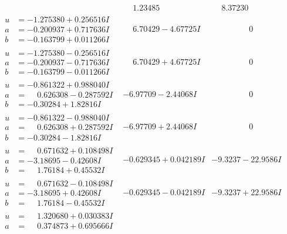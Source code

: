 \documentclass[1p]{elsarticle_modified}
\theoremstyle{definition}
\begin{document}
$$\begin{array}{c|c|c}
 & \phantom{-}1.23485\phantom{ +0.000000I} & \phantom{-}8.37230\phantom{ +0.000000I} \\ \hline\begin{aligned}
u &= -1.275380 + 0.256516 I \\
a &= -0.200937 + 0.717636 I \\
b &= -0.163799 + 0.011266 I\end{aligned}
 & \phantom{-}6.70429 - 4.67725 I & \phantom{-0.000000 } 0 \\ \hline\begin{aligned}
u &= -1.275380 - 0.256516 I \\
a &= -0.200937 - 0.717636 I \\
b &= -0.163799 - 0.011266 I\end{aligned}
 & \phantom{-}6.70429 + 4.67725 I & \phantom{-0.000000 } 0 \\ \hline\begin{aligned}
u &= -0.861322 + 0.988040 I \\
a &= \phantom{-}0.626308 - 0.287592 I \\
b &= -0.30284 + 1.82816 I\end{aligned}
 & -6.97709 - 2.44068 I & \phantom{-0.000000 } 0 \\ \hline\begin{aligned}
u &= -0.861322 - 0.988040 I \\
a &= \phantom{-}0.626308 + 0.287592 I \\
b &= -0.30284 - 1.82816 I\end{aligned}
 & -6.97709 + 2.44068 I & \phantom{-0.000000 } 0 \\ \hline\begin{aligned}
u &= \phantom{-}0.671632 + 0.108498 I \\
a &= -3.18695 - 0.42608 I \\
b &= \phantom{-}1.76184 + 0.45532 I\end{aligned}
 & -0.629345 + 0.042189 I & -9.3237 - 22.9586 I \\ \hline\begin{aligned}
u &= \phantom{-}0.671632 - 0.108498 I \\
a &= -3.18695 + 0.42608 I \\
b &= \phantom{-}1.76184 - 0.45532 I\end{aligned}
 & -0.629345 - 0.042189 I & -9.3237 + 22.9586 I \\ \hline\begin{aligned}
u &= \phantom{-}1.320680 + 0.030383 I \\
a &= \phantom{-}0.374873 + 0.695666 I \\

\end{aligned}
\end{array}$$
\end{document}
